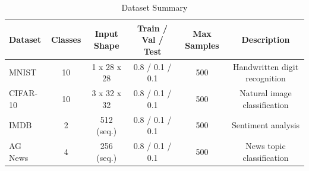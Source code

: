 \begin{table}[t]
\centering
\caption{Dataset Summary}
\label{tab:dataset_summary}
\small
\begin{tabular}{lccccc}
\toprule
Dataset & Classes & Input Shape & Train / Val / Test & Max Samples & Description \\
\midrule
MNIST & 10 & 1 x 28 x 28 & 0.8 / 0.1 / 0.1 & 500 & Handwritten digit recognition \\
CIFAR-10 & 10 & 3 x 32 x 32 & 0.8 / 0.1 / 0.1 & 500 & Natural image classification \\
IMDB & 2 & 512 (seq.) & 0.8 / 0.1 / 0.1 & 500 & Sentiment analysis \\
AG News & 4 & 256 (seq.) & 0.8 / 0.1 / 0.1 & 500 & News topic classification \\
\bottomrule
\end{tabular}
\end{table}

